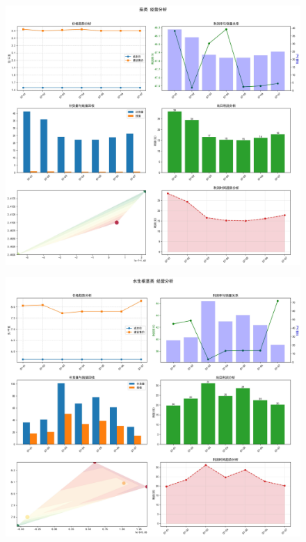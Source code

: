 \documentclass{cumcmthesis} %
\begin{document}
\begin{figure}[H]
    \centering
    \begin{minipage}[c]{0.49\textwidth}
        \centering
        \includegraphics[width=\textwidth]{fig/茄类_可视化.jpg}
        \label{fig:sample-figure-e}
    \end{minipage}
    \hfill
    \begin{minipage}[c]{0.49\textwidth}
        \centering
        \includegraphics[width=\textwidth]{fig/水生根茎类_可视化.jpg}
        \label{fig:sample-figure-f}
    \end{minipage}
\end{figure}
\end{document}
